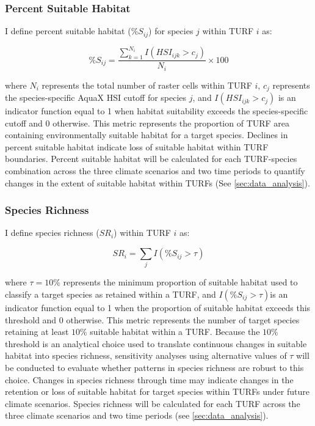 \documentclass[12pt]{article}
\begin{document}
\subsubsection{Percent Suitable Habitat}

I define percent suitable habitat (\%$S_{ij}$) for species $j$ within TURF $i$ as:

\begin{equation}
\%S_{ij} =
\frac{\sum_{k=1}^{N_i} I(HSI_{ijk}>c_j)}
{N_i}\times100
\label{eq:percent_suitable}
\end{equation}

where $N_i$ represents the total number of raster cells within TURF $i$, $c_j$ represents the species-specific AquaX HSI cutoff for species $j$, and $I(HSI_{ijk}>c_j)$ is an indicator function equal to 1 when habitat suitability exceeds the species-specific cutoff and 0 otherwise. This metric represents the proportion of TURF area containing environmentally suitable habitat for a target species. Declines in percent suitable habitat indicate loss of suitable habitat within TURF boundaries. Percent suitable habitat will be calculated for each TURF-species combination across the three climate scenarios and two time periods to quantify changes in the extent of suitable habitat within TURFs (See \autoref{sec:data_analysis}). 

\subsubsection{Species Richness}

I define species richness ($SR_i$) within TURF $i$ as:

\begin{equation}
    SR_i = \sum_j I(\%S_{ij}>\tau)
    \label{eq:species_richness}
\end{equation}

where $\tau = 10\%$ represents the minimum proportion of suitable habitat used to classify a target species as retained within a TURF, and $I(\%S_{ij}>\tau)$is an indicator function equal to 1 when the proportion of suitable habitat exceeds this threshold and 0 otherwise. This metric represents the number of target species retaining at least $10\%$ suitable habitat within a TURF. Because the $10\%$ threshold is an analytical choice used to translate continuous changes in suitable habitat into species richness, sensitivity analyses using alternative values of $\tau$ will be conducted to evaluate whether patterns in species richness are robust to this choice. Changes in species richness through time may indicate changes in the retention or loss of suitable habitat for target species within TURFs under future climate scenarios. Species richness will be calculated for each TURF across the three climate scenarios and two time periods (see \autoref{sec:data_analysis}).
\end{document}
